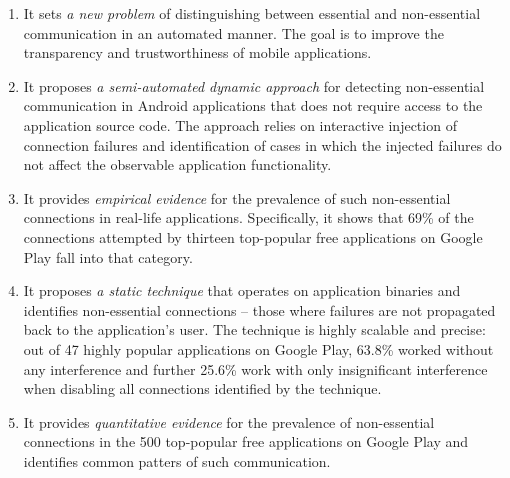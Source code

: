 \vspace{-0.05in}
\begin{enumerate}[leftmargin=0.5cm]\setlength{\itemsep}{-0.01in}

\item It sets \emph{a new problem} of distinguishing between essential and non-essential communication in an automated manner. The goal is to improve the
transparency and trustworthiness of mobile applications.

\item It proposes \emph{a semi-automated dynamic approach} for detecting non-essential communication in Android applications that does not require access to the application source code. 
The approach relies on interactive injection of connection failures and identification of cases in which the injected failures do not affect the observable application functionality. 

\item It provides \emph{empirical evidence} for the prevalence of such non-essential connections in real-life applications. Specifically, it shows that 69\% of the connections attempted by thirteen top-popular free applications on Google Play fall into that category.    

\item It proposes \emph{a static technique} that operates on application binaries and identifies non-essential connections -- those where failures are not propagated back to the application's user. The technique is highly scalable and precise: out of 47 highly popular applications on Google Play, 
63.8\% worked without any interference and further 25.6\% work with only insignificant interference when 
disabling all connections identified by the technique.


\item It provides \emph{quantitative evidence} for the prevalence of non-essential connections in the 500 top-popular free applications on Google Play and identifies common patters of such communication. 


\end{enumerate}




